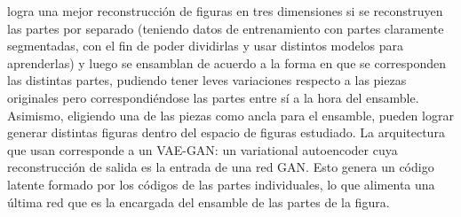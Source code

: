 \documentclass[spanish]{article}
\begin{document}

\cite{Li2019} logra una mejor reconstrucción de figuras en tres dimensiones si se reconstruyen las partes por separado (teniendo datos de entrenamiento con partes claramente segmentadas, con el fin de poder dividirlas y usar distintos modelos para aprenderlas) y luego se ensamblan de acuerdo a la forma en que se corresponden las distintas partes, pudiendo tener leves variaciones respecto a las piezas originales pero correspondiéndose las partes entre sí a la hora del ensamble. Asimismo, eligiendo una de las piezas como ancla para el ensamble, pueden lograr generar distintas figuras dentro del espacio de figuras estudiado. La arquitectura que usan corresponde a un VAE-GAN: un variational autoencoder cuya reconstrucción de salida es la entrada de una red GAN. Esto genera un código latente formado por los códigos de las partes individuales, lo que alimenta una última red que es la encargada del ensamble de las partes de la figura.




\end{document}
